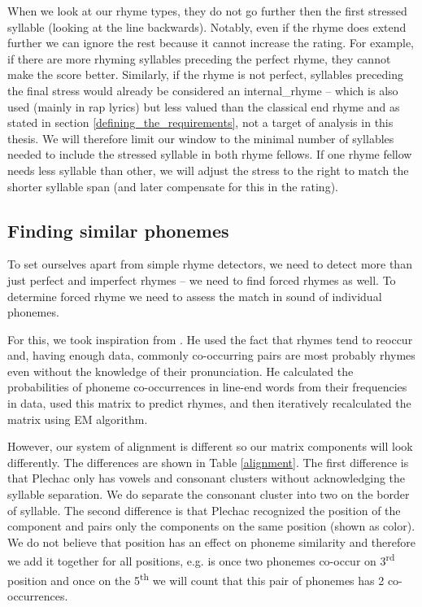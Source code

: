 When we look at our rhyme types, they do not go further then the first stressed syllable (looking at the line backwards). Notably, even if the rhyme does extend further we can ignore the rest because it cannot increase the rating. For example, if there are more rhyming syllables preceding the perfect rhyme, they cannot make the score better. Similarly, if the rhyme is not perfect, syllables preceding the final stress would already be considered an \gls{internal_rhyme} -- which is also used (mainly in rap lyrics) but less valued than the classical end rhyme and as stated in section \ref{defining_the_requirements}, not a target of analysis in this thesis. We will therefore limit our window to the minimal number of syllables needed to include the stressed syllable in both rhyme fellows. If one rhyme fellow needs less syllable than other, we will adjust the stress to the right to match the shorter syllable span (and later compensate for this in the rating).


\subsection{Finding similar phonemes}
To set ourselves apart from simple rhyme detectors, we need to detect more than just perfect and imperfect rhymes -- we need to find forced rhymes as well. To determine forced rhyme we need to assess the match in sound of individual phonemes.

For this, we took inspiration from \cite{plechavc2018collocation}. He used the fact that rhymes tend to reoccur and, having enough data, commonly co-occurring pairs are most probably rhymes even without the knowledge of their pronunciation. He calculated the probabilities of phoneme co-occurrences in line-end words from their frequencies in data, used this matrix to predict rhymes, and then iteratively recalculated the matrix using EM algorithm. 

However, our system of alignment is different so our matrix components will look differently. The differences are shown in Table \ref{alignment}. The first difference is that Plechac only has vowels and consonant clusters without acknowledging the syllable separation. We do separate the consonant cluster into two on the border of syllable. The second difference is that Plechac recognized the position of the component and pairs only the components on the same position (shown as color). We do not believe that position has an effect on phoneme similarity and therefore we add it together for all positions, e.g. is once two phonemes co-occur on 3\textsuperscript{rd} position and once on the 5\textsuperscript{th} we will count that this pair of phonemes has 2 co-occurrences.

